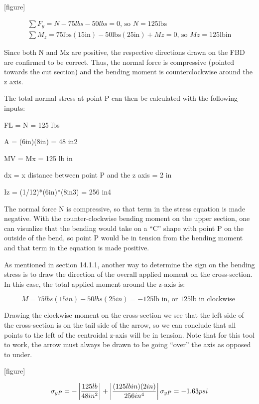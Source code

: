\documentclass[
  letterpaper,
  DIV=11,
  numbers=noendperiod]{scrreprt}
\begin{document}
\begin{tcolorbox}
\begin{tcolorbox}
{[}figure{]}

\[
\begin{gathered}
\sum F_y=N-75 l b s-50 l b s=0 \text {, so } N=125 \mathrm{lbs} \\
\sum M_z=75 \mathrm{lbs}(15 \mathrm{in})-50 \mathrm{lbs}(25 \mathrm{in})+M z=0 \text {, so } M z=125 \mathrm{lb} \mathrm{in}
\end{gathered}
\]

Since both N and Mz are positive, the respective directions drawn on the
FBD are confirmed to be correct. Thus, the normal force is compressive
(pointed towards the cut section) and the bending moment is
counterclockwise around the z axis.

The total normal stress at point P can then be calculated with the
following inputs:

FL = N = 125 lbs

A = (6in)(8in) = 48 in2

MV = Mx = 125 lb in

dx = x distance between point P and the z axis = 2 in

Iz = (1/12)*(6in)*(8in3) = 256 in4

The normal force N is compressive, so that term in the stress equation
is made negative. With the counter-clockwise bending moment on the upper
section, one can visualize that the bending would take on a ``C'' shape
with point P on the outside of the bend, so point P would be in tension
from the bending moment and that term in the equation is made positive.

As mentioned in section 14.1.1, another way to determine the sign on the
bending stress is to draw the direction of the overall applied moment on
the cross-section. In this case, the total applied moment around the
z-axis is:

\[
M=75 l b s(15 i n)-50 l b s(25 i n)=-125 \mathrm{lb} \text { in, or } 125 \mathrm{lb} \text { in clockwise }
\]

Drawing the clockwise moment on the cross-section we see that the left
side of the cross-section is on the tail side of the arrow, so we can
conclude that all points to the left of the centroidal z-axis will be in
tension. Note that for this tool to work, the arrow must always be drawn
to be going ``over'' the axis as opposed to under.

{[}figure{]}

\[
\sigma_{y P}=-\left|\frac{125 l b}{48 i n^2}\right|+\left|\frac{(125 l b i n)(2 i n)}{256 i n^4}\right| \\
\sigma_{y P}=-1.63 p s i
\]


\end{tcolorbox}
\end{tcolorbox}
\end{document}
